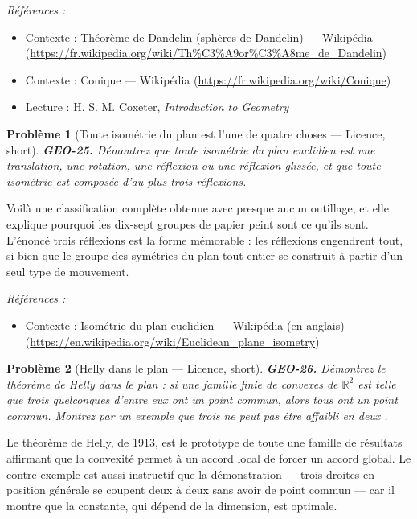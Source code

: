 \documentclass[11pt]{article}
\newtheorem{problem}{Problème}
\newenvironment{refs}{\par\small\noindent\emph{Références :}\begin{itemize}\setlength\itemsep{0pt}}{\end{itemize}\normalsize}
\begin{document}
\begin{refs}
\item Contexte : Théorème de Dandelin (sphères de Dandelin) --- Wikipédia (\url{https://fr.wikipedia.org/wiki/Th%C3%A9or%C3%A8me_de_Dandelin})
\item Contexte : Conique --- Wikipédia (\url{https://fr.wikipedia.org/wiki/Conique})
\item Lecture : H. S. M. Coxeter, \textit{Introduction to Geometry}
\end{refs}

\bigskip

\begin{problem}[{Toute isométrie du plan est l'une de quatre choses --- Licence, short}]
\textbf{GEO-25.} Démontrez que toute isométrie du plan euclidien est une translation, une rotation, une réflexion ou une réflexion glissée, et que toute isométrie est composée d'au plus trois réflexions.
\end{problem}

\noindent Voilà une classification complète obtenue avec presque aucun outillage, et elle explique pourquoi les dix-sept groupes de papier peint sont ce qu'ils sont. L'énoncé \og{} trois réflexions \fg{} est la forme mémorable : les réflexions engendrent tout, si bien que le groupe des symétries du plan tout entier se construit à partir d'un seul type de mouvement.

\begin{refs}
\item Contexte : Isométrie du plan euclidien --- Wikipédia (en anglais) (\url{https://en.wikipedia.org/wiki/Euclidean_plane_isometry})
\end{refs}

\bigskip

\begin{problem}[{Helly dans le plan --- Licence, short}]
\textbf{GEO-26.} Démontrez le théorème de Helly dans le plan : si une famille finie de convexes de $ \mathbb{R}^2 $ est telle que trois quelconques d'entre eux ont un point commun, alors tous ont un point commun. Montrez par un exemple que \og{} trois \fg{} ne peut pas être affaibli en \og{} deux \fg{}.
\end{problem}

\noindent Le théorème de Helly, de 1913, est le prototype de toute une famille de résultats affirmant que la convexité permet à un accord local de forcer un accord global. Le contre-exemple est aussi instructif que la démonstration --- trois droites en position générale se coupent deux à deux sans avoir de point commun --- car il montre que la constante, qui dépend de la dimension, est optimale.
\end{document}

